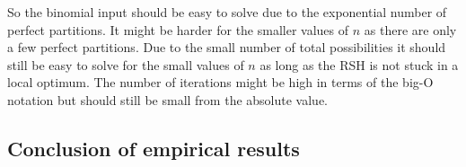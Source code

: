 
So the binomial input should be easy to solve due to the exponential number of perfect partitions.
It might be harder for the smaller values of $n$ as there are only a few perfect partitions.
Due to the small number of total possibilities it should still be easy to solve for the small values of $n$ as long as the RSH is not stuck in a local optimum.
The number of iterations might be high in terms of the big-O notation but should still be small from the absolute value.



\subsection{Conclusion of empirical results}
